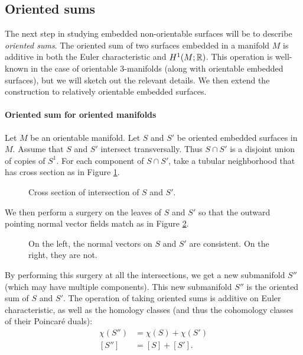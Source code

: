 \subsection{Oriented sums}
\label{sec:oriented-sums}

The next step in studying embedded non-orientable surfaces will be to describe \emph{oriented sums}.
The oriented sum of two surfaces embedded in a manifold $M$ is additive in both the Euler characteristic and $H^1(M;\mathbb{R})$.
This operation is well-known in the case of orientable $3$-manifolds (along with orientable embedded surfaces), but we will sketch out the relevant details.
We then extend the construction to relatively orientable embedded surfaces.

\paragraph{Oriented sum for oriented manifolds}
Let $M$ be an orientable manifold.  
Let $S$ and $S'$ be oriented embedded surfaces in $M$.
Assume that $S$ and $S'$ intersect transversally.
Thus $S \cap S'$ is a disjoint union of copies of $S^1$.
For each component of $S\cap S'$, take a tubular neighborhood that has cross section as in Figure \ref{fig:cross-section}.

\begin{figure}
  \centering
  \caption{Cross section of intersection of $S$ and $S'$.}
  \label{fig:cross-section}
\end{figure}

We then perform a surgery on the leaves of $S$ and $S'$ so that the outward pointing normal vector fields match as in Figure \ref{fig:surgery}.
\begin{figure}
  \centering
  \caption{On the left, the normal vectors on $S$ and $S'$ are consistent. On the right, they are not.}
  \label{fig:surgery}
\end{figure}

By performing this surgery at all the intersections, we get a new submanifold $S''$ (which may have multiple components).
This new submanifold $S''$ is the oriented sum of $S$ and $S'$.
The operation of taking oriented sums is additive on Euler characteristic, as well as the homology classes (and thus the cohomology classes of their Poincar\'e duals):
\begin{align*}
  \chi(S'') &= \chi(S) + \chi(S') \\
  [S''] &= [S] + [S'].
\end{align*}

